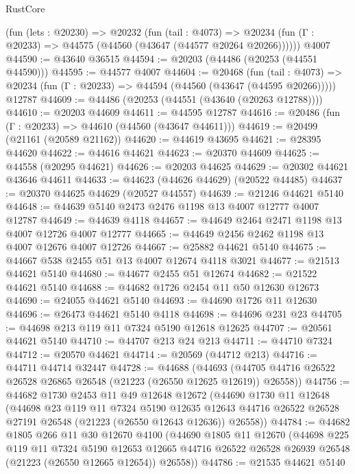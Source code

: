 \begin{lexlean}{RustCore}
\begin{coremodule}
    (fun (lets : @20230) =>
    @20232
      (fun (tail : @4073) =>
      @20234 (fun (Γ : @20233) => @44575 (@44560 (@43647 (@44577 @20264 @20266))))))
    @4007
@44590 := @43640 @36515
@44594 := @20203 (@44486 (@20253 (@44551 @44590)))
@44595 := @44577 @4007
@44604 := @20468
    (fun (tail : @4073) => @20234 (fun (Γ : @20233) => @44594 (@44560 (@43647 (@44595 @20266)))))
    @12787
@44609 := @44486 (@20253 (@44551 (@43640 (@20263 @12788))))
@44610 := @20203 @44609
@44611 := @44595 @12787
@44616 := @20486 (fun (Γ : @20233) => @44610 (@44560 (@43647 @44611)))
@44619 := @20499 (@21161 (@20589 @21162))
@44620 := @44619 @43695
@44621 := @28395 @44620
@44622 := @44616 @44621
@44623 := @20370 @44609
@44625 := @44558 (@20295 @44621)
@44626 := @20203 @44625
@44629 := @20302 @44621 @43646 @44611
@44633 := @44623 (@44626 @44629) (@20522 @44485)
@44637 := @20370 @44625 @44629 (@20527 @44557)
@44639 := @21246 @44621 @5140
@44648 := @44639 @5140 @2473 @2476 @1198 @13 @4007 @12777 @4007 @12787
@44649 := @44639 @4118
@44657 := @44649 @2464 @2471 @1198 @13 @4007 @12726 @4007 @12777
@44665 := @44649 @2456 @2462 @1198 @13 @4007 @12676 @4007 @12726
@44667 := @25882 @44621 @5140
@44675 := @44667 @538 @2455 @51 @13 @4007 @12674 @4118 @3021
@44677 := @21513 @44621 @5140
@44680 := @44677 @2455 @51 @12674
@44682 := @21522 @44621 @5140
@44688 := @44682 @1726 @2454 @11 @50 @12630 @12673
@44690 := @24055 @44621 @5140
@44693 := @44690 @1726 @11 @12630
@44696 := @26473 @44621 @5140 @4118
@44698 := @44696 @231 @23
@44705 := @44698 @213 @119 @11 @7324 @5190 @12618 @12625
@44707 := @20561 @44621 @5140
@44710 := @44707 @213 @24 @213
@44711 := @44710 @7324
@44712 := @20570 @44621
@44714 := @20569 (@44712 @213)
@44716 := @44711 @44714 @32447
@44728 := @44688
    (@44693 (@44705 @44716 @26522 @26528 @26865 @26548 (@21223 (@26550 @12625 @12619)) @26558))
@44756 := @44682
    @1730
    @2453
    @11
    @49
    @12648
    @12672
    (@44690
      @1730
      @11
      @12648
      (@44698
        @23
        @119
        @11
        @7324
        @5190
        @12635
        @12643
        @44716
        @26522
        @26528
        @27191
        @26548
        (@21223 (@26550 @12643 @12636))
        @26558))
@44784 := @44682
    @1805
    @266
    @11
    @30
    @12670
    @4100
    (@44690
      @1805
      @11
      @12670
      (@44698
        @225
        @119
        @11
        @7324
        @5190
        @12653
        @12665
        @44716
        @26522
        @26528
        @26939
        @26548
        (@21223 (@26550 @12665 @12654))
        @26558))
@44786 := @21535 @44621 @5140

\end{coremodule}
\end{lexlean}
